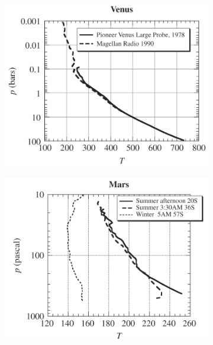 \begin{figure}[H]
\begin{subfigure}[t]{0.3\linewidth}
    \end{subfigure}
    \begin{subfigure}[t]{0.3\linewidth}
        \includegraphics[width=\linewidth]{Figures/Thermodynamics/Venus Radiosonde.png}
    \end{subfigure}
    \centering
    \begin{subfigure}[b]{0.3\linewidth}
        \includegraphics[width=\linewidth]{Figures/Thermodynamics/Mars Radiosonde.png}
    \end{subfigure}\quad
    \begin{subfigure}[b]{0.3\linewidth}

\end{subfigure}
\end{figure}
